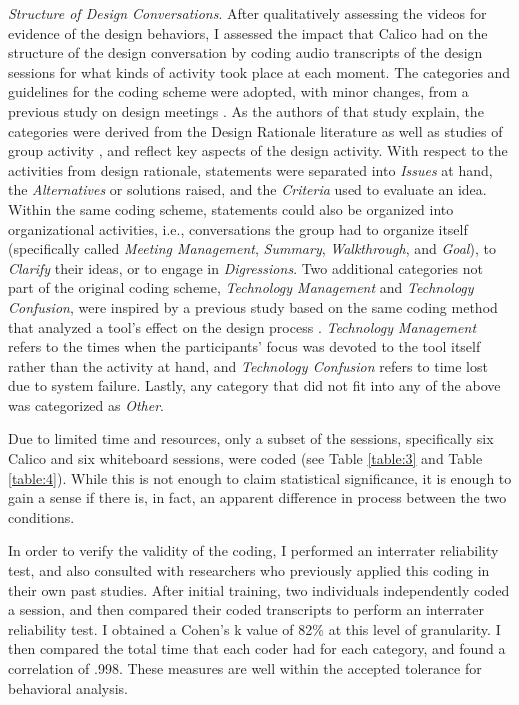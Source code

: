 \documentclass[12pt,fleqn]{ucithesis}
\begin{document}
    \emph{Structure of Design Conversations}. After qualitatively assessing the videos for evidence of the design behaviors, I assessed the impact that Calico had on the structure of the design conversation by coding audio transcripts of the design sessions for what kinds of activity took place at each moment. The categories and guidelines for the coding scheme were adopted, with minor changes, from a previous study on design meetings \citep{Olson}. As the authors of that study explain, the categories were derived from the Design Rationale literature \citep{Moran} as well as studies of group activity \citep{PUTNAM}, and reflect key aspects of the design activity. With respect to the activities from design rationale, statements were separated into \emph{Issues} at hand, the \emph{Alternatives} or solutions raised, and the \emph{Criteria} used to evaluate an idea. Within the same coding scheme, statements could also be organized into organizational activities, i.e., conversations the group had to organize itself (specifically called \emph{Meeting Management}, \emph{Summary}, \emph{Walkthrough}, and \emph{Goal}), to \emph{Clarify} their ideas, or to engage in \emph{Digressions}. Two additional categories not part of the original coding scheme, \emph{Technology Management} and \emph{Technology Confusion}, were inspired by a previous study based on the same coding method that analyzed a tool's effect on the design process \citep{Olsonb}. \emph{Technology Management} refers to the times when the participants' focus was devoted to the tool itself rather than the activity at hand, and \emph{Technology Confusion} refers to time lost due to system failure. Lastly, any category that did not fit into any of the above was categorized as \emph{Other}. 

Due to limited time and resources, only a subset of the sessions, specifically six Calico and six whiteboard sessions, were coded (see Table \ref{table:3} and Table \ref{table:4}). While this is not enough to claim statistical significance, it is enough to gain a sense if there is, in fact, an apparent difference in process between the two conditions.

In order to verify the validity of the coding, I performed an interrater reliability test, and also consulted with researchers who previously applied this coding in their own past studies. After initial training, two individuals independently coded a session, and then compared their coded transcripts to perform an interrater reliability test. I obtained a Cohen's k value of 82\% at this level of granularity. I then compared the total time that each coder had for each category, and found a correlation of .998. These measures are well within the accepted tolerance for behavioral analysis.
\end{document}
